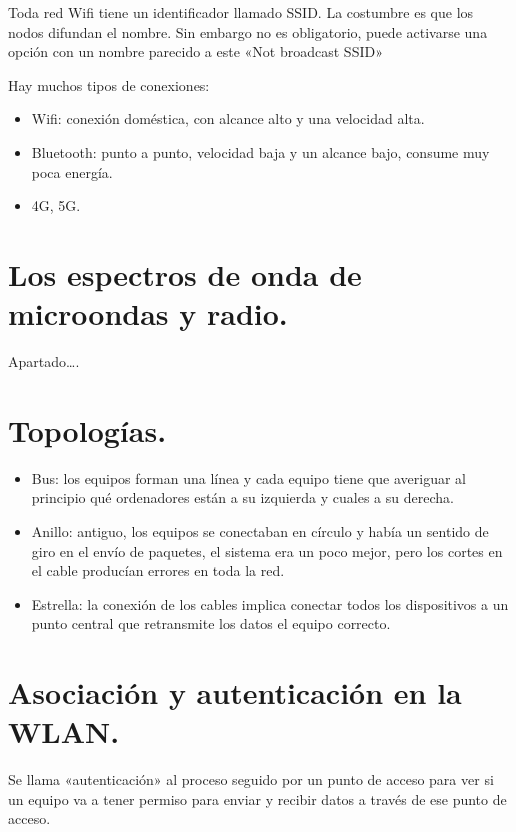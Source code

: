 \documentclass[letterpaper,10pt,spanish]{sphinxmanual}
\begin{document}
Toda red Wifi tiene un identificador llamado SSID. La costumbre es que los nodos difundan el nombre. Sin embargo no es obligatorio, puede activarse una opción con un nombre parecido a este «Not broadcast SSID»

Hay muchos tipos de conexiones:
\begin{itemize}
\item {} 
Wifi: conexión doméstica, con alcance alto y una velocidad alta.

\item {} 
Bluetooth:  punto a punto, velocidad baja y un alcance bajo, consume muy poca energía.

\item {} 
4G, 5G.

\end{itemize}


\section{Los espectros de onda de microondas y radio.}
\label{\detokenize{t2_integracion_elementos/apuntes_t2:los-espectros-de-onda-de-microondas-y-radio}}
Apartado….


\section{Topologías.}
\label{\detokenize{t2_integracion_elementos/apuntes_t2:topologias}}\begin{itemize}
\item {} 
Bus: los equipos forman una línea y cada equipo tiene que averiguar al principio qué ordenadores están a su izquierda y cuales a su derecha. 

\item {} 
Anillo: antiguo,  los equipos se conectaban en círculo y había un sentido de giro en el envío de paquetes, el sistema era un poco mejor, pero los cortes en el cable producían errores en toda la red. 

\item {} 
Estrella: la conexión de los cables implica conectar todos los dispositivos a un punto central que retransmite los datos el equipo correcto. 

\end{itemize}


\section{Asociación y autenticación en la WLAN.}
\label{\detokenize{t2_integracion_elementos/apuntes_t2:asociacion-y-autenticacion-en-la-wlan}}
Se llama «autenticación» al proceso seguido por un punto de acceso para ver si un equipo va a tener permiso para enviar y recibir datos a través de ese punto de acceso.
\end{document}
